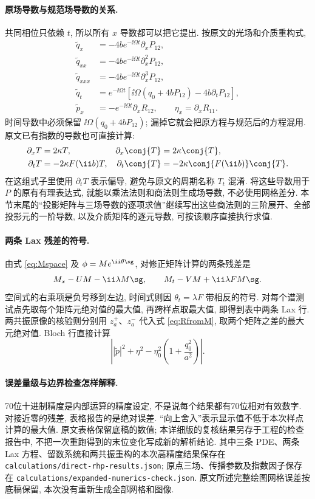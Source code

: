 \paragraph{原场导数与规范场导数的关系.}
共同相位只依赖 $t$, 所以所有 $x$ 导数都可以把它提出. 按原文的光场和介质重构式,
\begin{align*}
\widetilde q_x&=-4b e^{-\ii\Omega t}\partial_xP_{12},\\
\widetilde q_{xx}&=-4b e^{-\ii\Omega t}\partial_x^2P_{12},\\
\widetilde q_{xxx}&=-4b e^{-\ii\Omega t}\partial_x^3P_{12},\\
\widetilde q_t
&=e^{-\ii\Omega t}\left[\ii\Omega(q_0+4bP_{12})-4b\partial_tP_{12}\right],\\
\widetilde p_x&=-e^{-\ii\Omega t}\partial_xR_{12},\qquad
\eta_x=\partial_xR_{11}.
\end{align*}
时间导数中必须保留 $\ii\Omega(q_0+4bP_{12})$; 漏掉它就会把原方程与规范后的方程混用. 原文已有指数的导数也可直接计算:
\begin{align*}
\partial_xT&=2\kappa T,&
\partial_x\conj{T}&=2\kappa\conj{T},\\
\partial_tT&=-2\kappa F(\ii b)T,&
\partial_t\conj{T}&=-2\kappa\conj{F(\ii b)}\conj{T}.
\end{align*}
在这组式子里使用 $\partial_tT$ 表示偏导, 避免与原文的周期名称 $T_t$ 混淆. 将这些导数用于 $P$ 的原有有理表达式, 就能以乘法法则和商法则生成场导数, 不必使用网格差分.
本节末尾的``投影矩阵与三场导数的逐项求值''继续写出这些商法则的三阶展开、全部投影元的一阶导数, 以及介质矩阵的逐元导数, 可按该顺序直接执行求值.

\paragraph{两条 Lax 残差的符号.}
由式 \eqref{eq:Mspace} 及 $\phi=Me^{\ii\theta\sg}$, 对修正矩阵计算的两条残差是
\[
M_x-UM-\ii\lambda M\sg,\qquad
M_t-VM+\ii\lambda F M\sg.
\]
空间式的右乘项是负号移到左边, 时间式则因 $\theta_t=\lambda F$ 带相反的符号. 对每个谱测试点先取每个矩阵元绝对值的最大值, 再跨样点取最大值, 即得到表中两条 Lax 行. 两共振原像的核验则分别用 $z_a^+$、$z_a^-$ 代入式 \eqref{eq:RfromM}, 取两个矩阵之差的最大元绝对值. Bloch 行直接计算
\[
\left||\widetilde p|^2+\eta^2-
\eta_0^2\left(1+\dfrac{q_0^2}{a^2}\right)\right|.
\]

\paragraph{误差量级与边界检查怎样解释.}
70位十进制精度是内部运算的精度设定, 不是说每个结果都有70位相对有效数字. 对接近零的残差, 表格报告的是绝对误差. ``向上舍入''表示显示值不低于本次样点计算的最大值. 原文表格保留底稿的数值; 本详细版的复核结果另存于工程的检查报告中, 不把一次重跑得到的末位变化写成新的解析结论.
其中三条 PDE、两条 Lax 方程、留数系统和两共振重构的本次高精度结果保存在
\texttt{calculations/direct-rhp-results.json}; 原点三场、传播参数及指数因子保存在
\texttt{calculations/expanded-numerics-check.json}. 原文所述完整绘图网格误差按底稿保留, 本次没有重新生成全部网格和图像.

